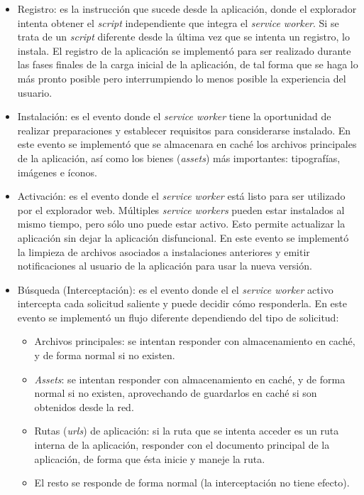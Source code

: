 \begin{itemize}
  \item Registro: es la instrucción que sucede desde la aplicación, donde el explorador intenta obtener el \textit{script} independiente que integra el \textit{service worker}. Si se trata de un \textit{script} diferente desde la última vez que se intenta un registro, lo instala. El registro de la aplicación se implementó para ser realizado durante las fases finales de la carga inicial de la aplicación, de tal forma que se haga lo más pronto posible pero interrumpiendo lo menos posible la experiencia del usuario.

  \item Instalación: es el evento donde el \textit{service worker} tiene la oportunidad de realizar preparaciones y establecer requisitos para considerarse instalado. En este evento se implementó que se almacenara en caché los archivos principales de la aplicación, así como los bienes (\textit{assets}) más importantes: tipografías, imágenes e íconos.

  \item Activación: es el evento donde el \textit{service worker} está listo para ser utilizado por el explorador web. Múltiples \textit{service workers} pueden estar instalados al mismo tiempo, pero sólo uno puede estar activo. Esto permite actualizar la aplicación sin dejar la aplicación disfuncional. En este evento se implementó la limpieza de archivos asociados a instalaciones anteriores y emitir notificaciones al usuario de la aplicación para usar la nueva versión.

  \item{
    Búsqueda (Interceptación): es el evento donde el el \textit{service worker} activo intercepta cada solicitud saliente y puede decidir cómo responderla. En este evento se implementó un flujo diferente dependiendo del tipo de solicitud:

    \begin{itemize}
      \item Archivos principales: se intentan responder con almacenamiento en caché, y de forma normal si no existen.
      \item \textit{Assets}: se intentan responder con almacenamiento en caché, y de forma normal si no existen, aprovechando de guardarlos en caché si son obtenidos desde la red.
      \item Rutas (\textit{urls}) de aplicación: si la ruta que se intenta acceder es un ruta interna de la aplicación, responder con el documento principal de la aplicación, de forma que ésta inicie y maneje la ruta.
      \item El resto se responde de forma normal (la interceptación no tiene efecto).
    \end{itemize}
  }
\end{itemize}

